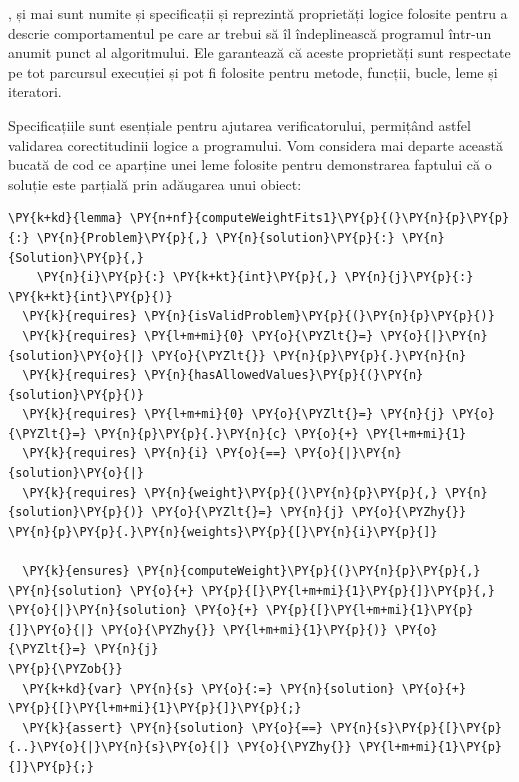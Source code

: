 \begin{sloppypar}
,  și  mai sunt numite și specificații și reprezintă proprietăți logice folosite pentru a descrie comportamentul pe care ar trebui să îl îndeplinească programul într-un anumit punct al algoritmului. Ele garantează că aceste proprietăți sunt respectate pe tot parcursul execuției și pot fi folosite pentru metode, funcții, bucle, leme și iteratori. \par
Specificațiile sunt esențiale pentru ajutarea verificatorului, permițând astfel validarea corectitudinii logice a programului. Vom considera mai departe această bucată de cod ce aparține unei leme folosite pentru demonstrarea faptului că o soluție este parțială prin adăugarea unui obiect:
\begin{Verbatim}[commandchars=\\\{\}]
\PY{k+kd}{lemma} \PY{n+nf}{computeWeightFits1}\PY{p}{(}\PY{n}{p}\PY{p}{:} \PY{n}{Problem}\PY{p}{,} \PY{n}{solution}\PY{p}{:} \PY{n}{Solution}\PY{p}{,} 
    \PY{n}{i}\PY{p}{:} \PY{k+kt}{int}\PY{p}{,} \PY{n}{j}\PY{p}{:} \PY{k+kt}{int}\PY{p}{)}
  \PY{k}{requires} \PY{n}{isValidProblem}\PY{p}{(}\PY{n}{p}\PY{p}{)}
  \PY{k}{requires} \PY{l+m+mi}{0} \PY{o}{\PYZlt{}=} \PY{o}{|}\PY{n}{solution}\PY{o}{|} \PY{o}{\PYZlt{}} \PY{n}{p}\PY{p}{.}\PY{n}{n}
  \PY{k}{requires} \PY{n}{hasAllowedValues}\PY{p}{(}\PY{n}{solution}\PY{p}{)}
  \PY{k}{requires} \PY{l+m+mi}{0} \PY{o}{\PYZlt{}=} \PY{n}{j} \PY{o}{\PYZlt{}=} \PY{n}{p}\PY{p}{.}\PY{n}{c} \PY{o}{+} \PY{l+m+mi}{1}
  \PY{k}{requires} \PY{n}{i} \PY{o}{==} \PY{o}{|}\PY{n}{solution}\PY{o}{|}
  \PY{k}{requires} \PY{n}{weight}\PY{p}{(}\PY{n}{p}\PY{p}{,} \PY{n}{solution}\PY{p}{)} \PY{o}{\PYZlt{}=} \PY{n}{j} \PY{o}{\PYZhy{}} \PY{n}{p}\PY{p}{.}\PY{n}{weights}\PY{p}{[}\PY{n}{i}\PY{p}{]}
  
  \PY{k}{ensures} \PY{n}{computeWeight}\PY{p}{(}\PY{n}{p}\PY{p}{,} \PY{n}{solution} \PY{o}{+} \PY{p}{[}\PY{l+m+mi}{1}\PY{p}{]}\PY{p}{,} \PY{o}{|}\PY{n}{solution} \PY{o}{+} \PY{p}{[}\PY{l+m+mi}{1}\PY{p}{]}\PY{o}{|} \PY{o}{\PYZhy{}} \PY{l+m+mi}{1}\PY{p}{)} \PY{o}{\PYZlt{}=} \PY{n}{j}
\PY{p}{\PYZob{}}
  \PY{k+kd}{var} \PY{n}{s} \PY{o}{:=} \PY{n}{solution} \PY{o}{+} \PY{p}{[}\PY{l+m+mi}{1}\PY{p}{]}\PY{p}{;}
  \PY{k}{assert} \PY{n}{solution} \PY{o}{==} \PY{n}{s}\PY{p}{[}\PY{p}{..}\PY{o}{|}\PY{n}{s}\PY{o}{|} \PY{o}{\PYZhy{}} \PY{l+m+mi}{1}\PY{p}{]}\PY{p}{;}


\end{Verbatim}
\end{sloppypar}
